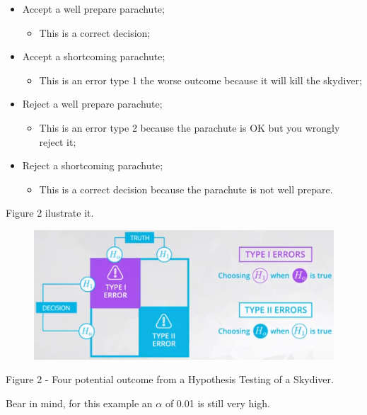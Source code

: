 \documentclass[]{book}
\providecommand{\tightlist}{%
  \setlength{\itemsep}{0pt}\setlength{\parskip}{0pt}}
\begin{document}
\begin{itemize}
\tightlist
\item
  Accept a well prepare parachute;

  \begin{itemize}
  \tightlist
  \item
    This is a correct decision;
  \end{itemize}
\item
  Accept a shortcoming parachute;

  \begin{itemize}
  \tightlist
  \item
    This is an error type 1 the worse outcome because it will kill the
    skydiver;
  \end{itemize}
\item
  Reject a well prepare parachute;

  \begin{itemize}
  \tightlist
  \item
    This is an error type 2 because the parachute is OK but you wrongly
    reject it;
  \end{itemize}
\item
  Reject a shortcoming parachute;

  \begin{itemize}
  \tightlist
  \item
    This is a correct decision because the parachute is not well
    prepare.
  \end{itemize}
\end{itemize}

Figure 2 ilustrate it.

\begin{figure}
\centering
\includegraphics{01-img/c4_l12_02.png}
\caption{}
\end{figure}

Figure 2 - Four potential outcome from a Hypothesis Testing of a
Skydiver.

Bear in mind, for this example an \(\alpha\) of 0.01 is still very high.
\end{document}
